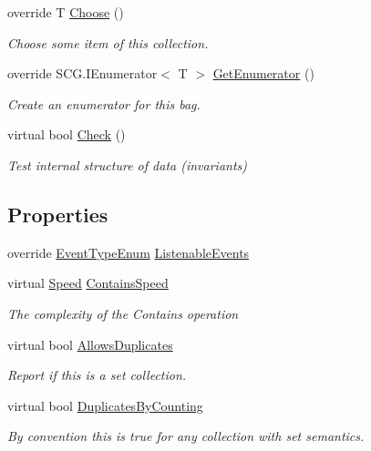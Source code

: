 \begin{DoxyCompactItemize}
override T \hyperlink{class_c5_1_1_hash_bag_ac17786a0542bbe968fc662d5e2749265}{Choose} ()
\begin{DoxyCompactList}\small\item\em Choose some item of this collection. \end{DoxyCompactList}\item 
override S\+C\+G.\+I\+Enumerator$<$ T $>$ \hyperlink{class_c5_1_1_hash_bag_a621d77b2f8a7c3a826aace4be1d809b2}{Get\+Enumerator} ()
\begin{DoxyCompactList}\small\item\em Create an enumerator for this bag. \end{DoxyCompactList}\item 
virtual bool \hyperlink{class_c5_1_1_hash_bag_a19a4c4b0767d7ef9e015bf8b9eadd1e9}{Check} ()
\begin{DoxyCompactList}\small\item\em Test internal structure of data (invariants) \end{DoxyCompactList}\end{DoxyCompactItemize}
\subsection*{Properties}
\begin{DoxyCompactItemize}
\item 
override \hyperlink{namespace_c5_a9143bfd561fffa025d21561674758008}{Event\+Type\+Enum} \hyperlink{class_c5_1_1_hash_bag_a676d1112960f86055de24540992f6310}{Listenable\+Events}
\item 
virtual \hyperlink{namespace_c5_a615ba88dcdaa8d5a3c5f833a73d7fad6}{Speed} \hyperlink{class_c5_1_1_hash_bag_aa3fed46c7ca11098f330ad791da98c31}{Contains\+Speed}
\begin{DoxyCompactList}\small\item\em The complexity of the Contains operation \end{DoxyCompactList}\item 
virtual bool \hyperlink{class_c5_1_1_hash_bag_a1aee5b97f3bf34a9c75838848aeff1fa}{Allows\+Duplicates}
\begin{DoxyCompactList}\small\item\em Report if this is a set collection. \end{DoxyCompactList}\item 
virtual bool \hyperlink{class_c5_1_1_hash_bag_a868b4e2fa4bdf260e0cd22663b313267}{Duplicates\+By\+Counting}
\begin{DoxyCompactList}\small\item\em By convention this is true for any collection with set semantics. \end{DoxyCompactList}\end{DoxyCompactItemize}
